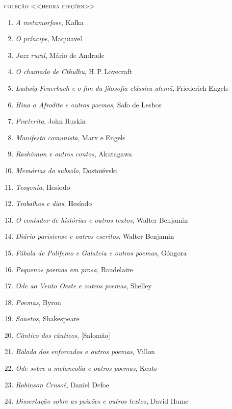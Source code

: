 \pagebreak
\blankpage

\pagestyle{empty}

\begingroup
\fontsize{7}{8}\selectfont
{\large\textsc{coleção <<hedra edições>>}}\\

\begin{enumerate}
\setlength\parskip{4.2pt}
\setlength\itemsep{-1.4mm}
\item \textit{A metamorfose}, Kafka
\item \textit{O príncipe}, Maquiavel
\item \textit{Jazz rural}, Mário de Andrade
\item \textit{O chamado de Cthulhu}, H.\,P.\,Lovecraft
\item \textit{Ludwig Feuerbach e o fim da filosofia clássica alemã}, Friederich Engels
\item \textit{Hino a Afrodite e outros poemas}, Safo de Lesbos 
\item \textit{Pr\ae terita}, John Ruskin
\item \textit{Manifesto comunista}, Marx e Engels
\item \textit{Rashômon e outros contos}, Akutagawa
\item \textit{Memórias do subsolo}, Dostoiévski
\item \textit{Teogonia}, Hesíodo
\item \textit{Trabalhos e dias}, Hesíodo
\item \textit{O contador de histórias e outros textos}, Walter Benjamin
\item \textit{Diário parisiense e outros escritos}, Walter Benjamin
\item \textit{Fábula de Polifemo e Galateia e outros poemas}, Góngora
\item \textit{Pequenos poemas em prosa}, Baudelaire
\item \textit{Ode ao Vento Oeste e outros poemas}, Shelley
\item \textit{Poemas}, Byron
\item \textit{Sonetos}, Shakespeare
\item \textit{Cântico dos cânticos}, [Salomão]
\item \textit{Balada dos enforcados e outros poemas}, Villon
\item \textit{Ode sobre a melancolia e outros poemas}, Keats
\item \textit{Robinson Crusoé}, Daniel Defoe
\item \textit{Dissertação sobre as paixões e outros textos}, David Hume

\end{enumerate}
